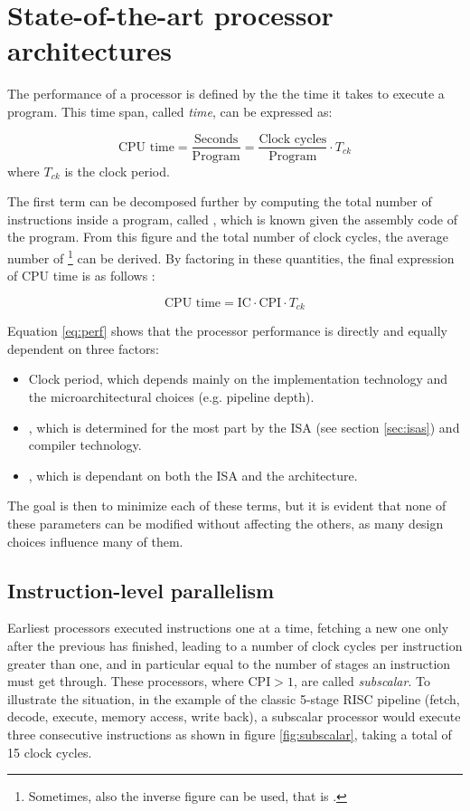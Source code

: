 \chapter{State-of-the-art processor architectures}
The performance of a processor is defined by the the time it takes to execute a program. This time span, called \emph{ time}, can be expressed as:

\begin{equation*}
  \text{CPU time} = \frac{\text{Seconds}}{\text{Program}} = \frac{\text{Clock cycles}}{\text{Program}} \cdot T_{ck}
\end{equation*}
where $T_{ck}$ is the clock period.

The first term can be decomposed further by computing the total number of instructions inside a program, called , which is known given the assembly code of the program. From this figure and the total number of clock cycles, the average number of \footnote{Sometimes, also the inverse figure can be used, that is .} can be derived. By factoring in these quantities, the final expression of \ac{CPU} time is as follows \cite[p.~53]{hennessy17}:

\begin{equation}\label{eq:perf}
  \text{CPU time} = \text{IC} \cdot \text{CPI} \cdot T_{ck} 
\end{equation}

Equation \eqref{eq:perf} shows that the processor performance is directly and equally dependent on three factors:
\begin{itemize}
  \item Clock period, which depends mainly on the implementation technology and the microarchitectural choices (e.g. pipeline depth).
  \item {}, which is determined for the most part by the \ac{ISA} (see section \ref{sec:isas}) and compiler technology.
  \item {}, which is dependant on both the \ac{ISA} and the architecture.
\end{itemize}
The goal is then to minimize each of these terms, but it is evident that none of these parameters can be modified without affecting the others, as many design choices influence many of them.

\section{Instruction-level parallelism}\label{sec:ilp}
Earliest processors executed instructions one at a time, fetching a new one only after the previous has finished, leading to a number of clock cycles per instruction greater than one, and in particular equal to the number of stages an instruction must get through. These processors, where $\text{CPI} > 1$, are called \emph{subscalar}. To illustrate the situation, in the example of the classic 5-stage RISC pipeline (fetch, decode, execute, memory access, write back), a subscalar processor would execute three consecutive instructions as shown in figure \ref{fig:subscalar}, taking a total of 15 clock cycles.


